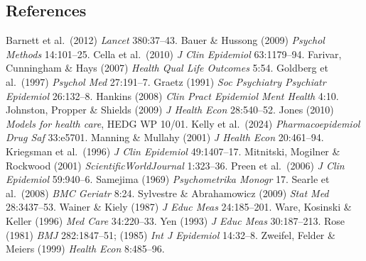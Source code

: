 \documentclass[11pt]{article}
\begin{document}
\subsection*{References}
{\small
Barnett et al.\ (2012) \emph{Lancet} 380:37--43.
Bauer \& Hussong (2009) \emph{Psychol Methods} 14:101--25.
Cella et al.\ (2010) \emph{J Clin Epidemiol} 63:1179--94.
Farivar, Cunningham \& Hays (2007) \emph{Health Qual Life Outcomes} 5:54.
Goldberg et al.\ (1997) \emph{Psychol Med} 27:191--7.
Graetz (1991) \emph{Soc Psychiatry Psychiatr Epidemiol} 26:132--8.
Hankins (2008) \emph{Clin Pract Epidemiol Ment Health} 4:10.
Johnston, Propper \& Shields (2009) \emph{J Health Econ} 28:540--52.
Jones (2010) \emph{Models for health care}, HEDG WP 10/01.
Kelly et al.\ (2024) \emph{Pharmacoepidemiol Drug Saf} 33:e5701.
Manning \& Mullahy (2001) \emph{J Health Econ} 20:461--94.
Kriegsman et al.\ (1996) \emph{J Clin Epidemiol} 49:1407--17.
Mitnitski, Mogilner \& Rockwood (2001) \emph{ScientificWorldJournal} 1:323--36.
Preen et al.\ (2006) \emph{J Clin Epidemiol} 59:940--6.
Samejima (1969) \emph{Psychometrika Monogr} 17.
Searle et al.\ (2008) \emph{BMC Geriatr} 8:24.
Sylvestre \& Abrahamowicz (2009) \emph{Stat Med} 28:3437--53.
Wainer \& Kiely (1987) \emph{J Educ Meas} 24:185--201.
Ware, Kosinski \& Keller (1996) \emph{Med Care} 34:220--33.
Yen (1993) \emph{J Educ Meas} 30:187--213.
Rose (1981) \emph{BMJ} 282:1847--51; (1985) \emph{Int J Epidemiol} 14:32--8.
Zweifel, Felder \& Meiers (1999) \emph{Health Econ} 8:485--96.
}
\end{document}
